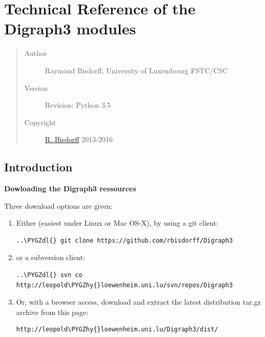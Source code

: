 \documentclass[letterpaper,10pt,english]{sphinxmanual}
\def\PYGZdl{\char`\$}
\def\PYGZhy{\char`\-}
\begin{document}
\section{Technical Reference of the Digraph3 modules}
\label{techDoc::doc}\label{techDoc:technical-reference-of-the-digraph3-modules}\begin{quote}\begin{description}
\item[{Author}] \leavevmode
Raymond Bisdorff, University of Luxembourg FSTC/CSC

\item[{Version}] \leavevmode
Revision: Python 3.5

\item[{Copyright}] \leavevmode
\href{http://leopold-loewenheim.uni.lu/bisdorff/}{R. Bisdorff} 2013-2016

\end{description}\end{quote}


\subsection{Introduction}
\label{techDoc:technical-label}\label{techDoc:introduction}
\textbf{Dowloading the Digraph3 ressources}

Three download options are given:
\begin{enumerate}
\item {} 
Either (easiest under Linux or Mac OS-X), by using a git client:

\begin{Verbatim}[commandchars=\\\{\}]
..\PYGZdl{} git clone https://github.com/rbisdorff/Digraph3
\end{Verbatim}

\item {} 
or a subversion client:

\begin{Verbatim}[commandchars=\\\{\}]
..\PYGZdl{} svn co http://leopold\PYGZhy{}loewenheim.uni.lu/svn/repos/Digraph3
\end{Verbatim}

\item {} 
Or, with a browser access, download and extract the latest distribution tar.gz archive from this page:

\begin{Verbatim}[commandchars=\\\{\}]
http://leopold\PYGZhy{}loewenheim.uni.lu/Digraph3/dist/
\end{Verbatim}

\end{enumerate}
\end{document}
